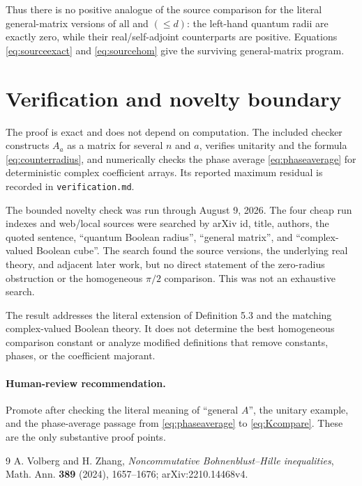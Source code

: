 \documentclass[11pt]{article}
\theoremstyle{remark}
\newcommand{\all}{\mathrm{all}}
\begin{document}
Thus there is no positive analogue of the source comparison for the literal
general-matrix versions of $\all$ and $(\leq d)$: the left-hand quantum
radii are exactly zero, while their real/self-adjoint counterparts are
positive.  Equations \eqref{eq:sourceexact} and \eqref{eq:sourcehom} give the
surviving general-matrix program.

\section{Verification and novelty boundary}

The proof is exact and does not depend on computation.  The included checker
constructs $A_a$ as a matrix for several $n$ and $a$, verifies unitarity and
the formula \eqref{eq:counterradius}, and numerically checks the phase average
\eqref{eq:phaseaverage} for deterministic complex coefficient arrays.  Its
reported maximum residual is recorded in \texttt{verification.md}.

The bounded novelty check was run through August 9, 2026.  The four cheap run
indexes and web/local sources were searched by arXiv id, title, authors, the
quoted sentence, ``quantum Boolean radius'', ``general matrix'', and
``complex-valued Boolean cube''.  The search found the source versions, the
underlying real theory, and adjacent later work, but no direct statement of
the zero-radius obstruction or the homogeneous $\pi/2$ comparison.  This was
not an exhaustive search.

The result addresses the literal extension of Definition 5.3 and the matching
complex-valued Boolean theory.  It does not determine the best homogeneous
comparison constant or analyze modified definitions that remove constants,
phases, or the coefficient majorant.

\paragraph{Human-review recommendation.}
Promote after checking the literal meaning of ``general $A$'', the unitary
example, and the phase-average passage from \eqref{eq:phaseaverage} to
\eqref{eq:Kcompare}.  These are the only substantive proof points.

\begin{thebibliography}{9}
A. Volberg and H. Zhang,
\emph{Noncommutative Bohnenblust--Hille inequalities},
Math. Ann. \textbf{389} (2024), 1657--1676;
arXiv:2210.14468v4.
\end{thebibliography}
\end{document}
